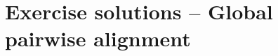 \documentclass[12pt, answers]{exam}
\begin{document}
\section{Exercise solutions -- Global pairwise alignment}

\begin{questions}















\end{questions}
       
\end{document}
